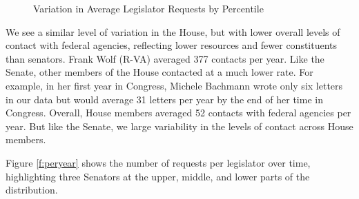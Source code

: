\documentclass[12pt]{article}
\begin{document}
\begin{figure}
\centering
\caption{Variation in Average Legislator Requests by Percentile} \label{f:contact1} 
\begin{minipage}{\textwidth}
\end{minipage}
\end{figure}


We see a similar level of variation in the House, but with lower overall levels of contact with federal agencies, reflecting lower resources and fewer constituents than senators. Frank Wolf (R-VA) averaged 377 contacts per year. Like the Senate, other members of the House contacted at a much lower rate.
For example, in her first year in Congress,  Michele Bachmann wrote only six letters in our data but would average 31 letters per year by the end of her time in Congress. 
Overall, House members averaged 52 contacts with federal agencies per year. But like the Senate, we large variability in the levels of contact across House members.  

Figure \ref{f:peryear} shows the number of requests per legislator over time, highlighting three Senators at the upper, middle, and lower parts of the distribution.
\end{document}
